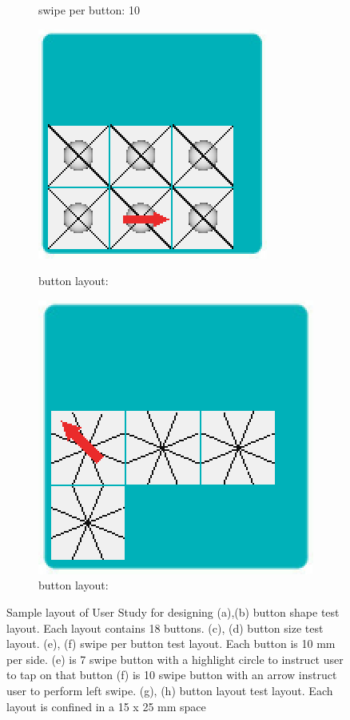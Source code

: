 \begin{figure}
\begin{subfigure}{.24\textwidth}
  \caption{swipe per button: 10}
  \label{fig:f3f}
\end{subfigure}
\begin{subfigure}{.24\textwidth}
  \centering
  \includegraphics[width=.7\linewidth]{figures/F3-7.png}
  \caption{button layout: }
  \label{fig:f3g}
  \includegraphics[width=.7\linewidth]{figures/F3-8.png}
  \caption{button layout: }
  \label{fig:f3h}
\end{subfigure}
\caption{Sample layout of User Study for designing \papertitle (a),(b) button shape test layout. Each layout contains 18 buttons. (c), (d) button size test layout. (e), (f) swipe per button test layout. Each button is 10 mm per side. (e) is 7 swipe button with a highlight circle to instruct user to tap on that button (f) is 10 swipe button with an arrow instruct user to perform left swipe.  (g), (h) button layout test layout. Each layout is confined in a 15 x 25 mm space}
\label{fig:f3}
\end{figure}

